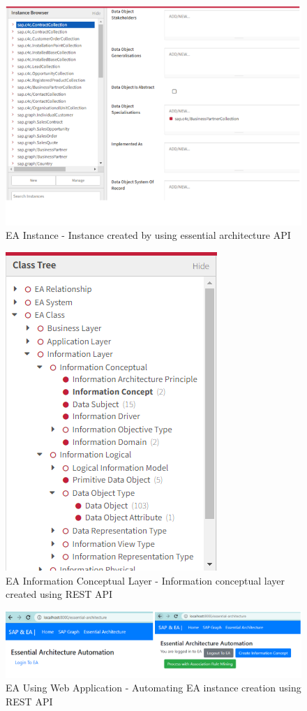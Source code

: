 \documentclass{article}
\begin{document}
\begin{figure}[ht!]
    \centering
    \includegraphics[scale=0.7]{ea-instance}
    \caption{EA Instance  - 
Instance created by using essential architecture API }
    \label{fig:ea-instance}
\end{figure}
\begin{figure}[ht!]
    \centering
    \includegraphics[scale=0.7]{ea-ic-2}
    \caption{EA Information Conceptual Layer  - 
Information conceptual layer created using REST API  }
    \label{fig:ea-information-concept}
\end{figure}
\begin{figure}[ht!]
    \centering
    \includegraphics[scale=0.7]{ea-web-2}
    \caption{EA Using Web Application  - 
Automating EA instance creation using REST API }
    \label{fig:ea-webapp}
\end{figure}
\end{document}
